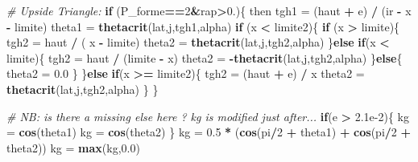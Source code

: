 \documentclass[
]{book}
\newenvironment{Shaded}{\begin{snugshade}}{\end{snugshade}}
\newcommand{\CommentTok}[1]{\textcolor[rgb]{0.56,0.35,0.01}{\textit{#1}}}
\newcommand{\ControlFlowTok}[1]{\textcolor[rgb]{0.13,0.29,0.53}{\textbf{#1}}}
\newcommand{\DecValTok}[1]{\textcolor[rgb]{0.00,0.00,0.81}{#1}}
\newcommand{\FloatTok}[1]{\textcolor[rgb]{0.00,0.00,0.81}{#1}}
\newcommand{\KeywordTok}[1]{\textcolor[rgb]{0.13,0.29,0.53}{\textbf{#1}}}
\newcommand{\NormalTok}[1]{#1}
\newcommand{\OperatorTok}[1]{\textcolor[rgb]{0.81,0.36,0.00}{\textbf{#1}}}
\newcommand{\StringTok}[1]{\textcolor[rgb]{0.31,0.60,0.02}{#1}}
\begin{document}
\begin{Shaded}
\begin{Highlighting}[]
  \CommentTok{# Upside Triangle:}
  \ControlFlowTok{if}\NormalTok{ (P_forme}\OperatorTok{==}\DecValTok{2}\OperatorTok{&}\NormalTok{rap}\OperatorTok{>}\FloatTok{0.}\NormalTok{)\{ then}
\NormalTok{    tgh1 =}\StringTok{ }\NormalTok{(haut }\OperatorTok{+}\StringTok{ }\NormalTok{e) }\OperatorTok{/}\StringTok{ }\NormalTok{(ir }\OperatorTok{-}\StringTok{ }\NormalTok{x }\OperatorTok{-}\StringTok{ }\NormalTok{limite)}
\NormalTok{    theta1 =}\StringTok{ }\KeywordTok{thetacrit}\NormalTok{(lat,j,tgh1,alpha)}
    \ControlFlowTok{if}\NormalTok{ (x }\OperatorTok{<}\StringTok{ }\NormalTok{limite2)\{}
      \ControlFlowTok{if}\NormalTok{ (x }\OperatorTok{>}\StringTok{ }\NormalTok{limite)\{}
\NormalTok{        tgh2 =}\StringTok{ }\NormalTok{haut }\OperatorTok{/}\StringTok{ }\NormalTok{( x }\OperatorTok{-}\StringTok{ }\NormalTok{limite)}
\NormalTok{        theta2 =}\StringTok{ }\KeywordTok{thetacrit}\NormalTok{(lat,j,tgh2,alpha)}
\NormalTok{      \}}\ControlFlowTok{else} \ControlFlowTok{if}\NormalTok{(x }\OperatorTok{<}\StringTok{ }\NormalTok{limite)\{}
\NormalTok{        tgh2 =}\StringTok{ }\NormalTok{haut }\OperatorTok{/}\StringTok{ }\NormalTok{(limite }\OperatorTok{-}\StringTok{ }\NormalTok{x)}
\NormalTok{        theta2 =}\StringTok{ }\OperatorTok{-}\KeywordTok{thetacrit}\NormalTok{(lat,j,tgh2,alpha)}
\NormalTok{      \}}\ControlFlowTok{else}\NormalTok{\{}
\NormalTok{        theta2 =}\StringTok{ }\FloatTok{0.0}
\NormalTok{      \}}
\NormalTok{    \}}\ControlFlowTok{else} \ControlFlowTok{if}\NormalTok{(x }\OperatorTok{>=}\StringTok{ }\NormalTok{limite2)\{}
\NormalTok{      tgh2 =}\StringTok{ }\NormalTok{(haut }\OperatorTok{+}\StringTok{ }\NormalTok{e) }\OperatorTok{/}\StringTok{ }\NormalTok{x}
\NormalTok{      theta2 =}\StringTok{ }\KeywordTok{thetacrit}\NormalTok{(lat,j,tgh2,alpha)}
\NormalTok{    \}}
\NormalTok{  \}}
  
  \CommentTok{# NB: is there a missing else here ? kg is modified just after...}
  \ControlFlowTok{if}\NormalTok{(e }\OperatorTok{>}\StringTok{ }\FloatTok{2.1e-2}\NormalTok{)\{}
\NormalTok{    kg =}\StringTok{ }\KeywordTok{cos}\NormalTok{(theta1)}
\NormalTok{    kg =}\StringTok{ }\KeywordTok{cos}\NormalTok{(theta2)}
\NormalTok{  \}}
\NormalTok{  kg =}\StringTok{ }\FloatTok{0.5} \OperatorTok{*}\StringTok{ }\NormalTok{(}\KeywordTok{cos}\NormalTok{(pi}\OperatorTok{/}\DecValTok{2} \OperatorTok{+}\StringTok{ }\NormalTok{theta1) }\OperatorTok{+}\StringTok{ }\KeywordTok{cos}\NormalTok{(pi}\OperatorTok{/}\DecValTok{2} \OperatorTok{+}\StringTok{ }\NormalTok{theta2))}
\NormalTok{  kg =}\StringTok{ }\KeywordTok{max}\NormalTok{(kg,}\FloatTok{0.0}\NormalTok{)}
  

\end{Highlighting}
\end{Shaded}
\end{document}
